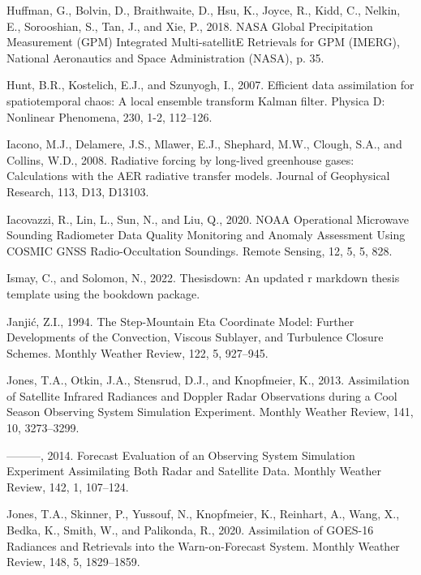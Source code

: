 \documentclass[12pt,oneside]{reedthesis}
\begin{document}
\leavevmode\hypertarget{ref-huffman2018}{}%
Huffman, G., Bolvin, D., Braithwaite, D., Hsu, K., Joyce, R., Kidd, C., Nelkin, E., Sorooshian, S., Tan, J., and Xie, P., 2018. NASA Global Precipitation Measurement (GPM) Integrated Multi-satellitE Retrievals for GPM (IMERG), National Aeronautics and Space Administration (NASA), p. 35.

\leavevmode\hypertarget{ref-hunt2007}{}%
Hunt, B.R., Kostelich, E.J., and Szunyogh, I., 2007. Efficient data assimilation for spatiotemporal chaos: A local ensemble transform Kalman filter. Physica D: Nonlinear Phenomena, 230, 1-2, 112--126.

\leavevmode\hypertarget{ref-iacono2008}{}%
Iacono, M.J., Delamere, J.S., Mlawer, E.J., Shephard, M.W., Clough, S.A., and Collins, W.D., 2008. Radiative forcing by long-lived greenhouse gases: Calculations with the AER radiative transfer models. Journal of Geophysical Research, 113, D13, D13103.

\leavevmode\hypertarget{ref-iacovazzi2020}{}%
Iacovazzi, R., Lin, L., Sun, N., and Liu, Q., 2020. NOAA Operational Microwave Sounding Radiometer Data Quality Monitoring and Anomaly Assessment Using COSMIC GNSS Radio-Occultation Soundings. Remote Sensing, 12, 5, 5, 828.

\leavevmode\hypertarget{ref-ismay2022}{}%
Ismay, C., and Solomon, N., 2022. Thesisdown: An updated r markdown thesis template using the bookdown package.

\leavevmode\hypertarget{ref-janjic1994}{}%
Janjić, Z.I., 1994. The Step-Mountain Eta Coordinate Model: Further Developments of the Convection, Viscous Sublayer, and Turbulence Closure Schemes. Monthly Weather Review, 122, 5, 927--945.

\leavevmode\hypertarget{ref-jones2013}{}%
Jones, T.A., Otkin, J.A., Stensrud, D.J., and Knopfmeier, K., 2013. Assimilation of Satellite Infrared Radiances and Doppler Radar Observations during a Cool Season Observing System Simulation Experiment. Monthly Weather Review, 141, 10, 3273--3299.

\leavevmode\hypertarget{ref-jones2014}{}%
---------, 2014. Forecast Evaluation of an Observing System Simulation Experiment Assimilating Both Radar and Satellite Data. Monthly Weather Review, 142, 1, 107--124.

\leavevmode\hypertarget{ref-jones2020}{}%
Jones, T.A., Skinner, P., Yussouf, N., Knopfmeier, K., Reinhart, A., Wang, X., Bedka, K., Smith, W., and Palikonda, R., 2020. Assimilation of GOES-16 Radiances and Retrievals into the Warn-on-Forecast System. Monthly Weather Review, 148, 5, 1829--1859.
\end{document}
